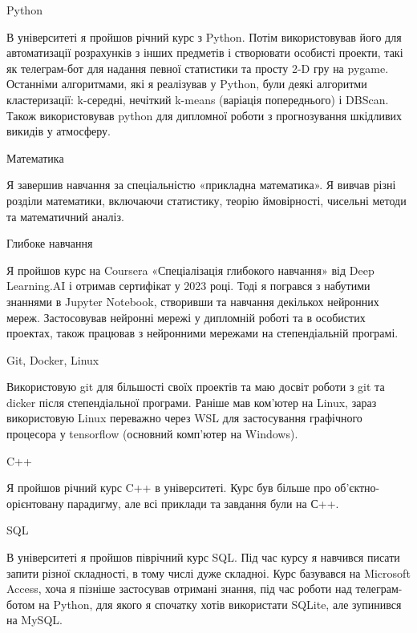 \documentclass[10pt, letterpaper]{article}
\begin{document}
            
        \begin{onecolentry}
            \begin{highlightsforbulletentries}


            \item Python


            В університеті я пройшов річний курс з Python. 
            Потім використовував його для автоматизації розрахунків з інших предметів і створювати особисті проекти, такі як телеграм-бот для надання певної статистики та просту 2-D гру на pygame. Останніми алгоритмами, які я реалізував у Python, були деякі алгоритми кластеризації: k-середні, нечіткий k-means (варіація попереднього) і DBScan. 
            Також використовував python для дипломної роботи з прогнозування шкідливих викидів у атмосферу. 

            \item Математика
            

            Я завершив навчання за спеціальністю «прикладна математика». 
            Я вивчав різні розділи математики, включаючи статистику, теорію ймовірності, чисельні методи та математичний аналіз. 


            \item Глибоке навчання 
            

            Я пройшов курс на Coursera «Спеціалізація глибокого навчання» від Deep Learning.AI і отримав сертифікат у 2023 році. 
            Тоді я погрався з набутими знаннями в Jupyter Notebook, створивши та навчання декількох нейронних мереж. 
            Застосовував нейронні мережі у дипломній роботі та в особистих проектах, також працював з нейронними мережами на степендіальній програмі.

            \item Git, Docker, Linux
            

            Використовую git для більшості своїх проектів та маю досвіт роботи з git та dicker після степендіальної програми. 
            Раніше мав ком'ютер на Linux, зараз використовую Linux переважно через WSL для застосування графічного процесора у tensorflow (основний комп'ютер на Windows).
            
            
            \item C++
            

            Я пройшов річний курс C++ в університеті. 
            Курс був більше про об'єктно-орієнтовану парадигму, але всі приклади та завдання були на С++. 


            \item SQL
            

            В університеті я пройшов піврічний курс SQL. 
            Під час курсу я навчився писати запити різної складності, в тому числі дуже складноі. 
            Курс базувався на Microsoft Access, хоча я пізніше застосував отримані знання, під час роботи над телеграм-ботом на Python, для якого я спочатку хотів використати SQLite, але зупинився на MySQL.
            

            \end{highlightsforbulletentries}
        \end{onecolentry}
\end{document}
